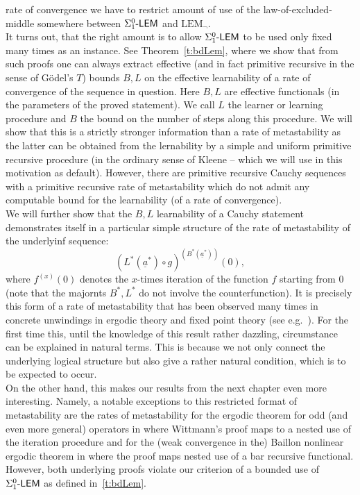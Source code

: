 rate of convergence we have to restrict amount of use of
the law-of-excluded-middle somewhere
between $\Sigma^0_1\textsf{\upshape -LEM}$ and $\mbox{LEM}_\neg$.  \\  
It turns out, that the right amount is to allow $\Sigma^0_1\textsf{\upshape -LEM}$ to be used
only fixed many times as an instance. See Theorem~\ref{t:bdLem}, where
we show that from such proofs one can always extract effective (and in 
fact primitive recursive in the sense of G\"odel's $T$) bounds $B,L$ on the 
effective learnability of a rate of convergence of the sequence in question.
 Here 
$B,L$ are effective functionals (in the parameters of the proved statement). We
call $L$ the learner or learning procedure and $B$ the bound on the number of 
steps along this procedure.  
We will show that this is a strictly stronger information than a 
rate of metastability as 
the latter can be obtained from the lernability
by a simple and uniform primitive 
recursive procedure (in the ordinary sense of Kleene -- which we will use in this motivation as default).
However, there are primitive recursive 
Cauchy sequences with a primitive recursive rate of metastability which 
do not admit any computable bound for the 
learnability (of a rate of convergence).\\ 
We will further show that the $B,L$ learnability of a Cauchy statement
demonstrates itself in a particular
simple structure of the rate of metastability of the underlyinf sequence:
\[ (L^*(\underline{a}^*)\circ g)^{(B^*(\underline{a}^*))}(0), \] 
where $f^{(x)}(0)$ denotes the $x$-times iteration of the function $f$ 
starting from $0$ (note that the majornts $B^*,L^*$ do not 
involve the counterfunction). It is precisely this form of a rate 
of metastability that has been observed many times in concrete unwindings 
in ergodic theory and fixed point theory (see e.g.~\cite{AGT10,kohlenbachleustean09,kohlenbachleustean10,Kohlenbach2011,Kohlenbach/Leustean6,Kohlenbach/Leustean7}). For the first time this, until the knowledge of this result rather dazzling, circumstance can be explained
in natural terms. This is because we not only connect the underlying logical structure but also give a rather natural condition,
which is to be expected to occur. \\
On the other hand, this makes our results from the next chapter even more interesting.
Namely, a notable exceptions to this restricted format of metastability are the rates 
of metastability for 
the ergodic theorem for odd (and even more general) operators in 
\cite{Safarik(11)} where Wittmann's proof maps to a nested use of the iteration procedure and 
for the (weak convergence in the) Baillon nonlinear ergodic theorem 
in \cite{Kohlenbach(Baillon)} where the proof maps nested use of a bar recursive 
functional. However, both underlying proofs violate our criterion of a bounded use of $\Sigma^0_1\textsf{\upshape -LEM}$
as defined in~\ref{t:bdLem}.\\

